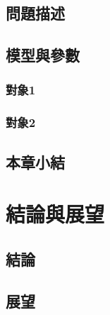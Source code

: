 \documentclass[14pt, a4paper,openany]{ctexbook} %
\renewcommand\thechapter{第\chinese{chapter}章}  %
\renewcommand{\chaptername}{{\thechapter}}
\numberwithin{figure}{chapter}
\numberwithin{table}{chapter}
\begin{document}
\section{問題描述}

\section{模型與參數}



\subsection{對象1}


\subsection{對象2}

\section{本章小結}



\newpage
\chapter{結論與展望}
\renewcommand{\chaptername}{第\chinese{chapter}章~~結論與展望}
\section{結論}



\section{展望}







\newpage
\renewcommand\bibname{參考文獻}
\begin{thebibliography}{999}
\renewcommand{\chaptername}{~~~參考文獻}




\end{thebibliography}
\end{document}
